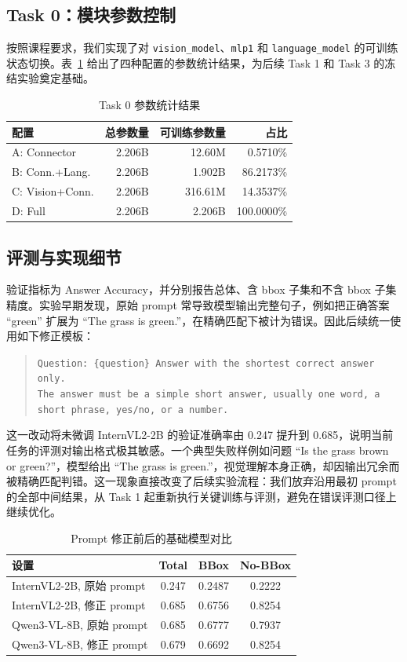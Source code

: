 \documentclass[9pt,twocolumn,a4paper]{ctexart}
\begin{document}
\subsection{Task 0：模块参数控制}
按照课程要求，我们实现了对 \texttt{vision\_model}、\texttt{mlp1} 和 \texttt{language\_model} 的可训练状态切换。表~\ref{tab:task0} 给出了四种配置的参数统计结果，为后续 Task 1 和 Task 3 的冻结实验奠定基础。

\begin{table}[H]
\centering
\caption{Task 0 参数统计结果}
\label{tab:task0}
\scriptsize
\begin{tabular}{lrrr}
\toprule
配置 & 总参数量 & 可训练参数量 & 占比 \\
\midrule
A: Connector & 2.206B & 12.60M & 0.5710\% \\
B: Conn.+Lang. & 2.206B & 1.902B & 86.2173\% \\
C: Vision+Conn. & 2.206B & 316.61M & 14.3537\% \\
D: Full & 2.206B & 2.206B & 100.0000\% \\
\bottomrule
\end{tabular}
\end{table}

\subsection{评测与实现细节}
验证指标为 Answer Accuracy，并分别报告总体、含 bbox 子集和不含 bbox 子集精度。实验早期发现，原始 prompt 常导致模型输出完整句子，例如把正确答案 ``green'' 扩展为 ``The grass is green.''，在精确匹配下被计为错误。因此后续统一使用如下修正模板：
\begin{quote}
\small
\texttt{Question: \{question\} Answer with the shortest correct answer only.\\
The answer must be a simple short answer, usually one word, a short phrase, yes/no, or a number.}
\end{quote}
这一改动将未微调 InternVL2-2B 的验证准确率由 0.247 提升到 0.685，说明当前任务的评测对输出格式极其敏感。一个典型失败样例如问题 ``Is the grass brown or green?''，模型给出 ``The grass is green.''，视觉理解本身正确，却因输出冗余而被精确匹配判错。这一现象直接改变了后续实验流程：我们放弃沿用最初 prompt 的全部中间结果，从 Task 1 起重新执行关键训练与评测，避免在错误评测口径上继续优化。

\begin{table}[H]
\centering
\caption{Prompt 修正前后的基础模型对比}
\label{tab:prompt-fix}
\scriptsize
\begin{tabular}{lccc}
\toprule
设置 & Total & BBox & No-BBox \\
\midrule
InternVL2-2B, 原始 prompt & 0.247 & 0.2487 & 0.2222 \\
InternVL2-2B, 修正 prompt & 0.685 & 0.6756 & 0.8254 \\
Qwen3-VL-8B, 原始 prompt & 0.685 & 0.6777 & 0.7937 \\
Qwen3-VL-8B, 修正 prompt & 0.679 & 0.6692 & 0.8254 \\
\bottomrule
\end{tabular}
\end{table}
\end{document}

